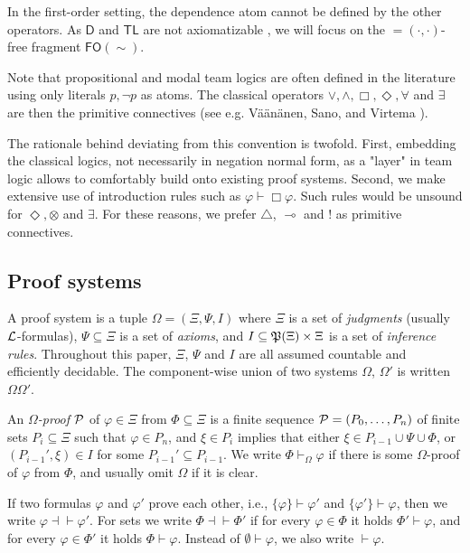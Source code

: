 \documentclass[a4paper,english,fleqn,11pt,final]{scrartcl}
\makeatletter
\newcommand{\ie}{i.e.\@\xspace}
\newcommand{\eg}{e.g.\@\xspace}
\newcommand{\pow}[1]{{\protect\ensuremath{\mathord{\mathfrak{P}(\nobreak#1\nobreak)}}}}
\newcommand{\negg}{{\sim}}
\newcommand{\depop}{{=\!\!(\cdot,\cdot)}}
\newcommand{\logic}[1]{\ensuremath{\mathsf{#1}}\xspace}
\newcommand{\D}{\logic{D}}
\newcommand{\FO}{\logic{FO}}
\newcommand{\TL}{\logic{TL}}
\newcommand{\calL}{\protect\ensuremath{\mathcal{L}}}
\newcommand{\calP}{\protect\ensuremath{\mathcal{P}}}
\newcommand{\limp}{\multimap}
\newcommand{\tens}{\otimes}
\DeclareMathOperator{\shriek}{!}
\theoremstyle{plain}
\theoremstyle{definition}
\makeatother
\begin{document}
\smallskip

In the first-order setting, the dependence atom cannot be defined by the other operators.
As $\D$ and $\TL$ are not axiomatizable \cite{vaananen_dependence_2007}, we will focus on the $\depop$-free fragment $\FO(\negg)$.

\smallskip

Note that propositional and modal team logics are often defined in the literature using only literals $p, \neg p$ as atoms.
The classical operators $\lor,\land,\Box,\Diamond,\forall$ and $\exists$ are then the primitive connectives (see \eg Väänänen, Sano, and Virtema \cite{sano_et_al,vaananen_modal_2008,vaananen_dependence_2007}).

The rationale behind deviating from this convention is twofold.
First, embedding the classical logics, not necessarily in negation normal form, as a "layer" in team logic allows to comfortably build onto existing proof systems.
Second, we make extensive use of introduction rules such as $\varphi \vdash \Box \varphi$.
Such rules would be unsound for $\Diamond,\tens$ and $\exists$.
For these reasons, we prefer $\triangle$, $\limp$ and $\shriek$ as primitive connectives.





\subsection{Proof systems}

A proof system is a tuple $\Omega = (\Xi, \Psi, I)$ where $\Xi$ is a set of \emph{judgments} (usually $\calL$-formulas), $\Psi \subseteq \Xi$ is a set of \emph{axioms}, and $I \subseteq \pow{\Xi} \times \Xi$ is a set of \emph{inference rules}.
Throughout this paper, $\Xi$, $\Psi$ and $I$ are all assumed countable and efficiently decidable.
The component-wise union of two systems $\Omega$, $\Omega'$ is written $\Omega\Omega'$.

An \emph{$\Omega$-proof $\calP$} of $\varphi \in \Xi$ from $\Phi \subseteq \Xi$ is a finite sequence $\calP = (P_0, \ldots, P_n)$ of finite sets $P_i \subseteq \Xi$ such that $\varphi \in P_n$, and $\xi \in P_i$ implies that either $\xi \in P_{i-1} \cup \Psi \cup \Phi$, or $(P_{i-1}', \xi) \in I$ for some $P_{i-1}' \subseteq P_{i-1}$.
We write $\Phi \vdash_\Omega \varphi$ if there is some $\Omega$-proof of $\varphi$ from $\Phi$, and usually omit $\Omega$ if it is clear.

If two formulas $\varphi$ and $\varphi'$ prove each other, \ie, $\{\varphi\} \vdash \varphi'$ and $\{\varphi'\}\vdash \varphi$, then we write $\varphi \dashv\vdash \varphi'$.
For sets we write $\Phi \dashv\vdash \Phi'$ if for every $\varphi \in \Phi$ it holds $\Phi' \vdash \varphi$, and for every $\varphi \in \Phi'$ it holds $\Phi \vdash \varphi$.
Instead of $\emptyset \vdash \varphi$, we also write $\vdash \varphi$.
\end{document}
